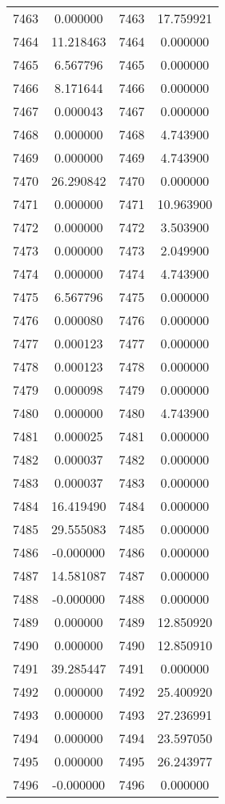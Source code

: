 \documentclass[12pt]{article}
\begin{document}
\begin{longtable}{@{}cccc@{}}
7463 & 0.000000 & 7463 & 17.759921 \\
7464 & 11.218463 & 7464 & 0.000000 \\
7465 & 6.567796 & 7465 & 0.000000 \\
7466 & 8.171644 & 7466 & 0.000000 \\
7467 & 0.000043 & 7467 & 0.000000 \\
7468 & 0.000000 & 7468 & 4.743900 \\
7469 & 0.000000 & 7469 & 4.743900 \\
7470 & 26.290842 & 7470 & 0.000000 \\
7471 & 0.000000 & 7471 & 10.963900 \\
7472 & 0.000000 & 7472 & 3.503900 \\
7473 & 0.000000 & 7473 & 2.049900 \\
7474 & 0.000000 & 7474 & 4.743900 \\
7475 & 6.567796 & 7475 & 0.000000 \\
7476 & 0.000080 & 7476 & 0.000000 \\
7477 & 0.000123 & 7477 & 0.000000 \\
7478 & 0.000123 & 7478 & 0.000000 \\
7479 & 0.000098 & 7479 & 0.000000 \\
7480 & 0.000000 & 7480 & 4.743900 \\
7481 & 0.000025 & 7481 & 0.000000 \\
7482 & 0.000037 & 7482 & 0.000000 \\
7483 & 0.000037 & 7483 & 0.000000 \\
7484 & 16.419490 & 7484 & 0.000000 \\
7485 & 29.555083 & 7485 & 0.000000 \\
7486 & -0.000000 & 7486 & 0.000000 \\
7487 & 14.581087 & 7487 & 0.000000 \\
7488 & -0.000000 & 7488 & 0.000000 \\
7489 & 0.000000 & 7489 & 12.850920 \\
7490 & 0.000000 & 7490 & 12.850910 \\
7491 & 39.285447 & 7491 & 0.000000 \\
7492 & 0.000000 & 7492 & 25.400920 \\
7493 & 0.000000 & 7493 & 27.236991 \\
7494 & 0.000000 & 7494 & 23.597050 \\
7495 & 0.000000 & 7495 & 26.243977 \\
7496 & -0.000000 & 7496 & 0.000000 \\

\end{longtable}
\end{document}
